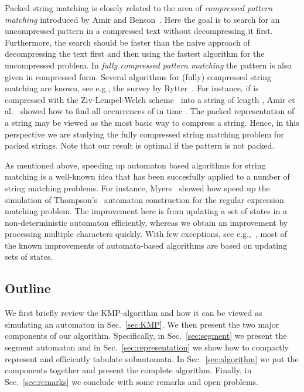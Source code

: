 \documentclass{article}
\begin{document}
Packed string matching is closely related to the area of
\emph{compressed pattern matching} introduced by Amir and
Benson~\cite{AB1992,AB1992a}. Here the goal is to search for an
uncompressed pattern in a compressed text without decompressing it
first. Furthermore, the search should be faster than the naive
approach of decompressing the text first and then using the fastest
algorithm for the uncompressed problem. In \emph{fully compressed
  pattern matching} the pattern is also given in compressed form.
Several algorithms for (fully) compressed string matching are known,
see e.g., the survey by Rytter~\cite{Rytter1999}. For instance, if 
is compressed with the Ziv-Lempel-Welch scheme~\cite{Welch1984} into a
string  of length , Amir et al.~\cite{ABF1996} showed how to
find all occurrences of  in time . The packed
representation of a string may be viewed as the most basic way to
compress a string. Hence, in this perspective we are studying the
fully compressed string matching problem for packed strings. Note that
our result is optimal if the pattern is not packed.


As mentioned above, speeding up automaton based algorithms for string
matching is a well-known idea that has been succesfully applied to a
number of string matching problems. For instance,
Myers~\cite{Myers1992} showed how speed up the simulation of
Thompson's~\cite{Thomp1968} automaton construction for the regular
expression matching problem. The improvement here is from updating a
set of states in a non-deterministic automaton efficiently, whereas we
obtain an improvement by processing multiple characters quickly.  With
few exceptions, see e.g.,~\cite{MP1980, BT2009}, most of the known
improvements of automata-based algorithms are based on updating sets
of states. 


\subsection{Outline}
We first briefly review the KMP-algorithm and how it can be viewed as
simulating an automaton in Sec.~\ref{sec:KMP}. We then present the
two major components of our algorithm. Specifically, in
Sec.~\ref{sec:segment} we present the segment automaton and in
Sec.~\ref{sec:representation} we show how to compactly represent
and efficiently tabulate subautomata. In Sec.~\ref{sec:algorithm}
we put the components together and present the complete
algorithm. Finally, in Sec.~\ref{sec:remarks} we conclude with some
remarks and open problems.
\end{document}
